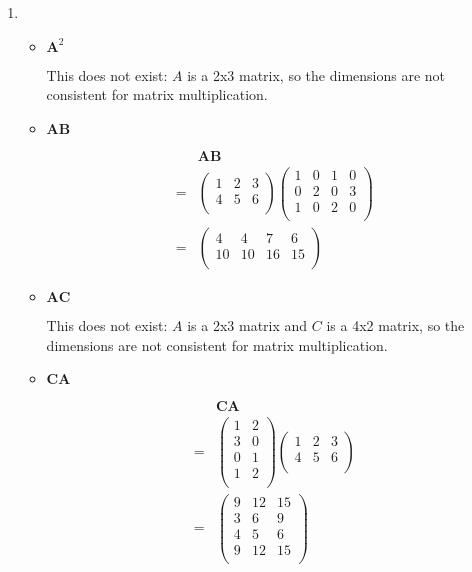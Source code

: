 \documentclass[10pt,oneside,a4paper]{article}
\begin{document}
\begin{enumerate}
\begin{enumerate}
\end{enumerate}

\item 

\begin{itemize}

\item $\mathbf{A}^2$

This does not exist: $A$ is a 2x3 matrix, so the dimensions are not consistent for matrix multiplication.

\item $\mathbf{AB}$

\[
\begin{split}
 & \mathbf{AB} \\
=& \begin{pmatrix} 1 & 2 & 3 \\ 4 & 5 & 6 \\ \end{pmatrix} \begin{pmatrix} 1 & 0 & 1 & 0 \\ 0 & 2 & 0 & 3 \\ 1 & 0 & 2 & 0 \\ \end{pmatrix} \\
=& \begin{pmatrix} 4 & 4 & 7 & 6 \\ 10 & 10 & 16 & 15 \\ \end{pmatrix}
\end{split}
\]

\item $\mathbf{AC}$

This does not exist: $A$ is a 2x3 matrix and $C$ is a 4x2 matrix, so the dimensions are not consistent for matrix multiplication.

\item $\mathbf{CA}$

\[
\begin{split}
 & \mathbf{CA} \\
=& \begin{pmatrix} 1 & 2 \\ 3 & 0 \\ 0 & 1 \\ 1 & 2 \\ \end{pmatrix} \begin{pmatrix} 1 & 2 & 3 \\ 4 & 5 & 6 \\ \end{pmatrix} \\
=& \begin{pmatrix} 9 & 12 & 15 \\ 3 & 6 & 9 \\ 4 & 5 & 6 \\ 9 & 12 & 15 \\ \end{pmatrix} \\
\end{split}
\]


\end{itemize}
\end{enumerate}
\end{document}
